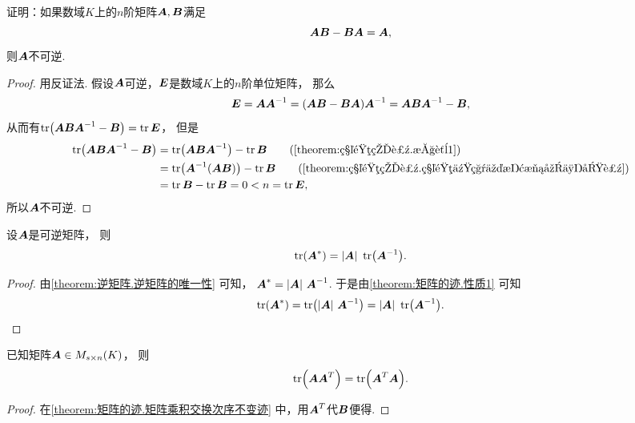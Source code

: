 \begin{example}
证明：如果数域\(K\)上的\(n\)阶矩阵\(\boldsymbol{A},\boldsymbol{B}\)满足\begin{equation*}
	\boldsymbol{A} \boldsymbol{B} - \boldsymbol{B} \boldsymbol{A}=\boldsymbol{A},
\end{equation*}
则\(\boldsymbol{A}\)不可逆.
\begin{proof}
用反证法.
假设\(\boldsymbol{A}\)可逆，\(\boldsymbol{E}\)是数域\(K\)上的\(n\)阶单位矩阵，
那么\begin{gather*}
	\vb{E} = \vb{A}\vb{A}^{-1}
	= (\vb{A} \vb{B} - \vb{B} \vb{A})\vb{A}^{-1} %
	= \vb{A} \vb{B} \vb{A}^{-1}-\vb{B},
\end{gather*}
从而有\(\tr(\boldsymbol{A} \boldsymbol{B} \boldsymbol{A}^{-1}-\boldsymbol{B}) = \tr\boldsymbol{E}\)，
但是\begin{align*}
	\tr(\vb{A} \vb{B} \vb{A}^{-1}-\vb{B})
	&= \tr(\vb{A} \vb{B} \vb{A}^{-1})-\tr\vb{B}
		\tag{\cref{theorem:矩阵的迹.性质1}} \\
	&= \tr(\vb{A}^{-1}(\vb{A} \vb{B}))-\tr\vb{B}
		\tag{\cref{theorem:矩阵的迹.矩阵乘积交换次序不变迹}} \\
	&= \tr\vb{B}-\tr\vb{B}
	= 0
	< n = \tr\vb{E},
\end{align*}
所以\(\boldsymbol{A}\)不可逆.
\end{proof}
\end{example}

\begin{property}
设\(\boldsymbol{A}\)是可逆矩阵，
则\begin{equation}
	\tr(\boldsymbol{A}^*) = \abs{\boldsymbol{A}}~\tr(\boldsymbol{A}^{-1}).
\end{equation}
\begin{proof}
由\cref{theorem:逆矩阵.逆矩阵的唯一性} 可知，
\(\boldsymbol{A}^* = \abs{\boldsymbol{A}}~\boldsymbol{A}^{-1}\).
于是由\cref{theorem:矩阵的迹.性质1} 可知\begin{equation*}
	\tr(\boldsymbol{A}^*) = \tr(\abs{\boldsymbol{A}}~\boldsymbol{A}^{-1}) = \abs{\boldsymbol{A}}~\tr(\boldsymbol{A}^{-1}).
	\qedhere
\end{equation*}
\end{proof}
\end{property}

\begin{property}
已知矩阵\(\boldsymbol{A} \in M_{s \times n}(K)\)，
则\begin{equation}
	\tr(\boldsymbol{A}\boldsymbol{A}^T) = \tr(\boldsymbol{A}^T\boldsymbol{A}).
\end{equation}
\begin{proof}
在\cref{theorem:矩阵的迹.矩阵乘积交换次序不变迹} 中，用\(\boldsymbol{A}^T\)代\(\boldsymbol{B}\)便得.
\end{proof}
\end{property}

